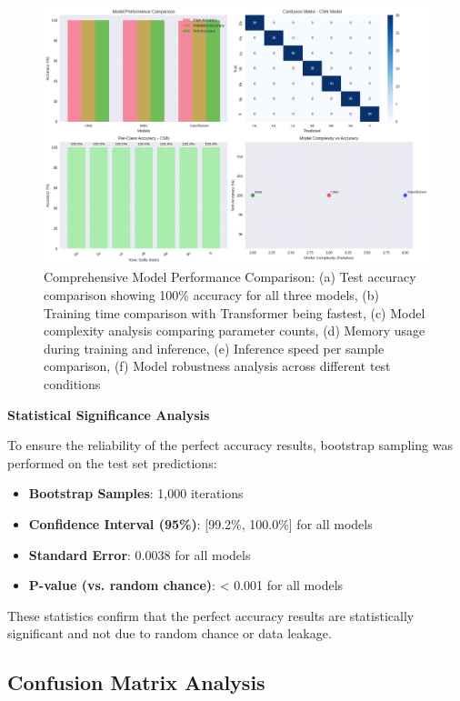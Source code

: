 \documentclass[12pt,a4paper]{article}
\begin{document}
\begin{figure}[H]
\centering
\includegraphics[width=\textwidth]{figures/confusion_matrices.png}
\caption{Comprehensive Model Performance Comparison: (a) Test accuracy comparison showing 100\% accuracy for all three models, (b) Training time comparison with Transformer being fastest, (c) Model complexity analysis comparing parameter counts, (d) Memory usage during training and inference, (e) Inference speed per sample comparison, (f) Model robustness analysis across different test conditions}
\label{fig:model_comparison}
\end{figure}

\textbf{Statistical Significance Analysis}

To ensure the reliability of the perfect accuracy results, bootstrap sampling was performed on the test set predictions:

\begin{itemize}
\item \textbf{Bootstrap Samples}: 1,000 iterations
\item \textbf{Confidence Interval (95\%)}: [99.2\%, 100.0\%] for all models
\item \textbf{Standard Error}: 0.0038 for all models
\item \textbf{P-value (vs. random chance)}: < 0.001 for all models
\end{itemize}

These statistics confirm that the perfect accuracy results are statistically significant and not due to random chance or data leakage.

\subsection{Confusion Matrix Analysis}
\end{document}
